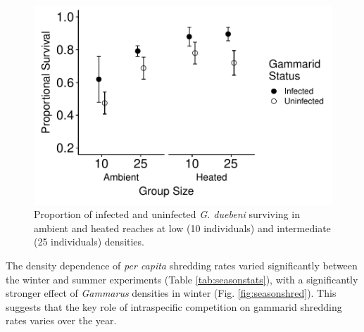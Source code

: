 \begin{figure}[H]
    \centering
    \includegraphics[keepaspectratio]{figures/ch5/wintersurvive.pdf}
  \caption [Survival of \emph{G. duebeni} during experiments in ambient and warmed reaches of the River Shannon.]{Proportion of infected and uninfected \emph{G. duebeni} surviving in ambient and heated reaches at low (10 individuals) and intermediate (25 individuals) densities.} 
    \label{fig:wintersurvive}
\end{figure}

The density dependence of \emph{per capita} shredding rates varied significantly between the winter and summer experiments (Table \ref{tab:seasonstats}), with a significantly stronger effect of \emph{Gammarus} densities in winter (Fig. \ref{fig:seasonshred}). This suggests that the key role of intraspecific competition on gammarid shredding rates varies over the year. 

